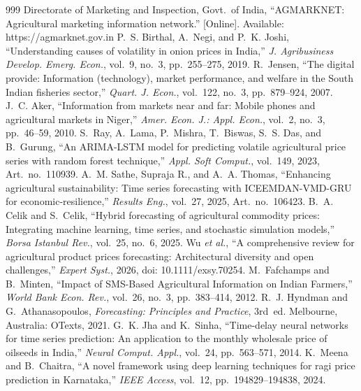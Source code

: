 \clearpage
{}
\begingroup\small\setlength{\itemsep}{1pt}\sloppy{}
\begin{thebibliography}{999}
 Directorate of Marketing and Inspection, Govt.\ of India, ``AGMARKNET: Agricultural marketing information network.'' [Online]. Available: https://agmarknet.gov.in
 P.~S. Birthal, A.~Negi, and P.~K. Joshi, ``Understanding causes of volatility in onion prices in India,'' \emph{J. Agribusiness Develop. Emerg. Econ.}, vol.~9, no.~3, pp.~255--275, 2019.
 R.~Jensen, ``The digital provide: Information (technology), market performance, and welfare in the South Indian fisheries sector,'' \emph{Quart. J. Econ.}, vol.~122, no.~3, pp.~879--924, 2007.
 J.~C. Aker, ``Information from markets near and far: Mobile phones and agricultural markets in Niger,'' \emph{Amer. Econ. J.: Appl. Econ.}, vol.~2, no.~3, pp.~46--59, 2010.
 S.~Ray, A.~Lama, P.~Mishra, T.~Biswas, S.~S. Das, and B.~Gurung, ``An ARIMA-LSTM model for predicting volatile agricultural price series with random forest technique,'' \emph{Appl. Soft Comput.}, vol.~149, 2023, Art.\ no.~110939.
 A.~M. Sathe, Supraja R., and A.~A. Thomas, ``Enhancing agricultural sustainability: Time series forecasting with ICEEMDAN-VMD-GRU for economic-resilience,'' \emph{Results Eng.}, vol.~27, 2025, Art.\ no.~106423.
 B.~A. Celik and S.~Celik, ``Hybrid forecasting of agricultural commodity prices: Integrating machine learning, time series, and stochastic simulation models,'' \emph{Borsa Istanbul Rev.}, vol.~25, no.~6, 2025.
 Wu \emph{et al.}, ``A comprehensive review for agricultural product prices forecasting: Architectural diversity and open challenges,'' \emph{Expert Syst.}, 2026, doi: 10.1111/exsy.70254.
 M.~Fafchamps and B.~Minten, ``Impact of SMS-Based Agricultural Information on Indian Farmers,'' \emph{World Bank Econ. Rev.}, vol.~26, no.~3, pp.~383--414, 2012.
 R.~J. Hyndman and G.~Athanasopoulos, \emph{Forecasting: Principles and Practice}, 3rd~ed. Melbourne, Australia: OTexts, 2021.
 G.~K. Jha and K.~Sinha, ``Time-delay neural networks for time series prediction: An application to the monthly wholesale price of oilseeds in India,'' \emph{Neural Comput. Appl.}, vol.~24, pp.~563--571, 2014.
 K.~Meena and B.~Chaitra, ``A novel framework using deep learning techniques for ragi price prediction in Karnataka,'' \emph{IEEE Access}, vol.~12, pp.~194829--194838, 2024.

\end{thebibliography}
